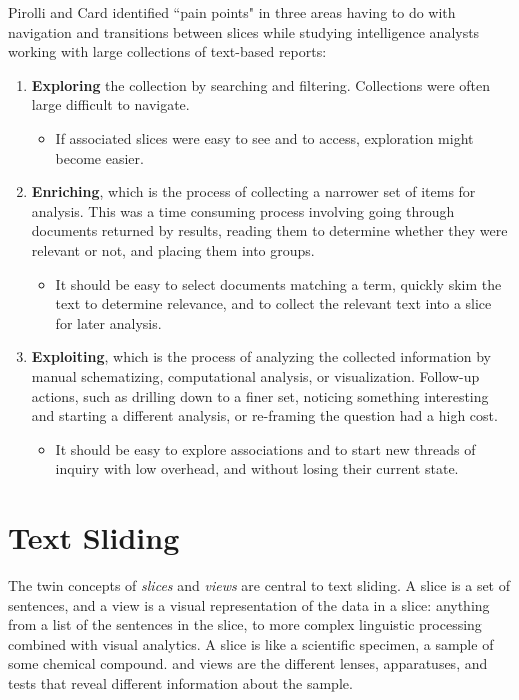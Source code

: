 \documentclass{sig-alternate}
\newcommand{\strong}[1] {\textbf{#1}}
\begin{document}
Pirolli and Card \cite{pirolli_sensemaking_2005} identified ``pain points" in three areas having to do with navigation and transitions between slices while studying intelligence analysts working with large collections of text-based reports:
\begin{enumerate}
\item \strong{Exploring} the collection by searching and filtering. Collections were often large difficult to navigate. 
	\begin{itemize}
		\item If  associated slices were easy to see and to access, exploration might become easier. 
	\end{itemize}
\item \strong{Enriching}, which is the process of collecting a narrower set of items for analysis. This was a time consuming process involving going through documents returned by results, reading them to determine whether they were relevant or not, and placing them into groups.
	\begin{itemize}
		\item It should be easy to select documents matching a term, quickly skim the text to determine relevance, and to collect the relevant text into a slice for later analysis.
	\end{itemize}
\item \strong{Exploiting}, which is the process of analyzing the collected information by manual schematizing, computational analysis, or visualization. Follow-up actions, such as drilling down to a finer set, noticing something interesting and starting a different analysis, or re-framing the question had a high cost.
	\begin{itemize}
		\item It should be easy to explore associations and to start new threads of inquiry with low overhead, and without losing their current state.
	\end{itemize}
\end{enumerate}


\section{Text Sliding}

The twin concepts of \emph{slices} and \emph{views} are central to text sliding. A slice is a set of sentences, and a view is a visual representation of the data in a slice: anything from a list of the sentences in the slice, to more complex linguistic processing combined with visual analytics.  A slice is like a scientific specimen, a sample of some chemical compound. and views are the different lenses, apparatuses, and tests that reveal different information about the sample.
\end{document}
